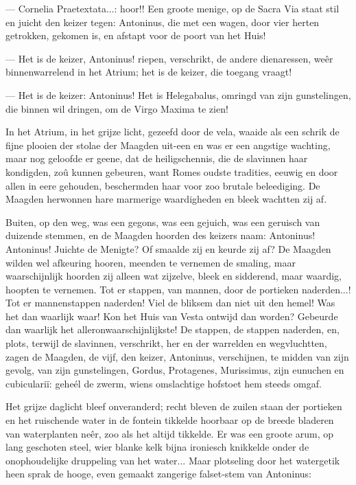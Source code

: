 \documentclass[a4paper, 12pt, oneside, dutch]{article}
\begin{document}
--- Cornelia Praetextata...: hoor!! Een groote menige, op de Sacra Via staat stil en juicht den keizer tegen: Antoninus, die met een wagen, door vier herten getrokken, gekomen is, en afstapt voor de poort van het Huis!

--- Het is de keizer, Antoninus! riepen, verschrikt, de andere dienaressen, weêr binnenwarrelend in het Atrium; het is de keizer, die toegang vraagt!

--- Het is de keizer: Antoninus! Het is Helegabalus, omringd van zijn gunstelingen, die binnen wil dringen, om de Virgo Maxima te zien!

In het Atrium, in het grijze licht, gezeefd door de vela, waaide als een schrik de fijne plooien der stolae der Maagden uit-een en was er een angstige wachting, maar nog geloofde er geene, dat de heiligschennis, die de slavinnen haar kondigden, zoû kunnen gebeuren, want Romes oudste tradities, eeuwig en door allen in eere gehouden, beschermden haar voor zoo brutale beleediging. De Maagden herwonnen hare marmerige waardigheden en bleek wachtten zij af.

Buiten, op den weg, was een gegons, was een gejuich, was een geruisch van duizende stemmen, en de Maagden hoorden des keizers naam: Antoninus! Antoninus! Juichte de Menigte? Of smaalde zij en keurde zij af? De Maagden wilden wel afkeuring hooren, meenden te vernemen de smaling, maar waarschijnlijk hoorden zij alleen wat zijzelve, bleek en sidderend, maar waardig, hoopten te vernemen. Tot er stappen, van mannen, door de portieken naderden...! Tot er mannenstappen naderden! Viel de bliksem dan niet uit den hemel! Was het dan waarlijk waar! Kon het Huis van Vesta ontwijd dan worden? Gebeurde dan waarlijk het alleronwaarschijnlijkste! De stappen, de stappen naderden, en, plots, terwijl de slavinnen, verschrikt, her en der warrelden en wegvluchtten, zagen de Maagden, de vijf, den keizer, Antoninus, verschijnen, te midden van zijn gevolg, van zijn gunstelingen, Gordus, Protagenes, Murissimus, zijn eunuchen en cubiculariï: geheél de zwerm, wiens omslachtige hofstoet hem steeds omgaf.

Het grijze daglicht bleef onveranderd; recht bleven de zuilen staan der portieken en het ruischende water in de fontein tikkelde hoorbaar op de breede bladeren van waterplanten neêr, zoo als het altijd tikkelde. Er was een groote arum, op lang geschoten steel, wier blanke kelk bijna ironiesch knikkelde onder de onophoudelijke druppeling van het water... Maar plotseling door het watergetik heen sprak de hooge, even gemaakt zangerige falset-stem van Antoninus:
\end{document}
